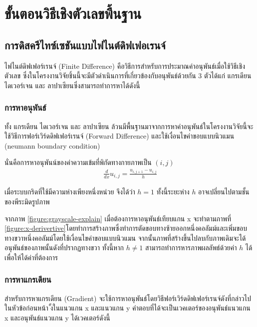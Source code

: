 \section{ขั้นตอนวิธีเชิงตัวเลขพื้นฐาน}
\subsection{การดิสครีไทซ์เซชันแบบไฟไนต์ดิฟเฟอเรนจ์}

\hspace{1cm}ไฟไนต์ดิฟเฟอร์เรนจ์ (Finite Difference) คือวิธีการสำหรับการประมาณค่าอนุพันธ์เมื่อใช้วิธีเชิงตัวเลข ซึ่งในโครงงานวิจัยชิ้นนี้จะมีตัวดำเนินการที่เกี่ยวข้องกับอนุพันธ์ด้วยกัน 3 ตัวได้แก่ แกรเดียน ไดเวอร์เจน และ ลาปาเซียนซึ่งสามารถทำการหาได้ดังนี้

\subsubsection{การหาอนุพันธ์}

\hspace{1cm}ทั้ง แกรเดียน ไดเวอร์เจน และ ลาปาเซียน ล้วนมีพื้นฐานมาจากการหาค่าอนุพันธ์ในโครงงานวิจัยนี้จะใช้วิธีการฟอร์เวิร์ดดิฟเฟอร์เรนจ์ (Forward Difference) และใช้เงื่อนไขค่าขอบแบบนิวแมน (neumann boundary condition)

\noindent\hspace{1cm}นั่นคือการหาอนุพันน์ของค่าความเข้มที่พิกัดทางกายภาพเป็น $(i,j)$
\begin{align*}
	\frac{d}{dx} u_{i,j} = \frac{u_{i,j+1} - u_{i,j}}{h}
\end{align*}

เมื่อระบบกริดที่ใช้มีความห่างเพียงหนึ่งหน่วย จึงได้ว่า $h=1$ ทั้งนี้ระยะห่าง $h$ อาจเปลี่ยนไปตามชั้นของพีระมิดรูปภาพ



\hspace{1cm} จากภาพ \ref{figure:grayscale-explain} เมื่อต้องการหาอนุพันธ์เทียบแกน x จะทำตามภาพที่ \ref{figure:x-derivertive}โดยทำการสร้างภาพซึ่งทำการตัดขอบทางซ้ายออกหนึ่งคอลัมม์และเพิ่มขอบทางขวาหนึ่งคอลัมม์โดยใช้เงื่อนไขค่าขอบแบบนิวแมน จากนั้นภาพที่สร้างขึ้นไปลบกับภาพเดิมจะได้อนุพันธ์ของภาพนั้นดังที่ปรากฏทางขวา ทั้งนี้หาก $ h \neq 1 $ สามารถทำการหารภาพผลลัพธ์ด้วยค่า $h$ ได้เพื่อให้ได้ค่าที่ต้องการ

\subsubsection{การหาแกรเดียน}
\noindent\hspace{1cm}สำหรับการหาแกรเดียน (Gradient) จะใช้การหาอนุพันธ์โดยวิธีฟอร์เวิร์ดดิฟเฟอร์เรนจ์ดังที่กล่าวไปในหัวข้อก่อนหน้า ั้งในแนวแกน x และแนวแกน y คำตอบที่ได้จะเป็นเวคเตอร์ของอนุพันธ์แนวแกน x และอนุพันธ์แนวแกน y  ได้เวคเตอร์ดังนี้ 

